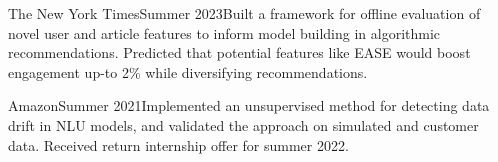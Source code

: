   {\large The New York Times}{Summer 2023}{}{Built a framework for offline evaluation of novel user and article features to inform model building in algorithmic recommendations. Predicted that potential features like EASE would boost engagement up-to 2\% while diversifying recommendations.}


  {\large Amazon}{Summer 2021}{}{Implemented an unsupervised method for detecting data drift in NLU models, and validated the approach on simulated and customer data. Received return internship offer for summer 2022.}
